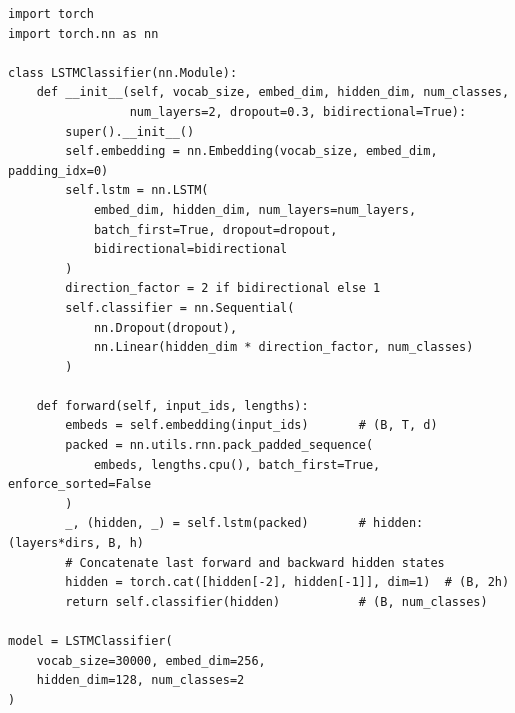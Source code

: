 \begin{codeblock}[title=\textbf{LSTM pour la classification de texte}]
\begin{verbatim}
import torch
import torch.nn as nn

class LSTMClassifier(nn.Module):
    def __init__(self, vocab_size, embed_dim, hidden_dim, num_classes,
                 num_layers=2, dropout=0.3, bidirectional=True):
        super().__init__()
        self.embedding = nn.Embedding(vocab_size, embed_dim, padding_idx=0)
        self.lstm = nn.LSTM(
            embed_dim, hidden_dim, num_layers=num_layers,
            batch_first=True, dropout=dropout,
            bidirectional=bidirectional
        )
        direction_factor = 2 if bidirectional else 1
        self.classifier = nn.Sequential(
            nn.Dropout(dropout),
            nn.Linear(hidden_dim * direction_factor, num_classes)
        )

    def forward(self, input_ids, lengths):
        embeds = self.embedding(input_ids)       # (B, T, d)
        packed = nn.utils.rnn.pack_padded_sequence(
            embeds, lengths.cpu(), batch_first=True, enforce_sorted=False
        )
        _, (hidden, _) = self.lstm(packed)       # hidden: (layers*dirs, B, h)
        # Concatenate last forward and backward hidden states
        hidden = torch.cat([hidden[-2], hidden[-1]], dim=1)  # (B, 2h)
        return self.classifier(hidden)           # (B, num_classes)

model = LSTMClassifier(
    vocab_size=30000, embed_dim=256,
    hidden_dim=128, num_classes=2
)
\end{verbatim}
\end{codeblock}

